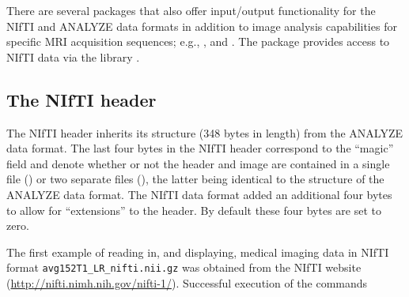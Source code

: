 \documentclass[
]{article}
\begin{document}
There are several  packages that also offer input/output
functionality for the NIfTI and ANALYZE data formats in addition to
image analysis capabilities for specific MRI acquisition sequences;
e.g.,  \citep{AnalyzeFMRI}, 
\citep{pol-tab:fmri} and  \citep{tractor.base}. The
 package provides access to NIfTI data via the
 library \citep{Rniftilib}.

\subsection{The NIfTI header}
\label{sec:nifti-header}

The NIfTI header inherits its structure (348 bytes in length) from the
ANALYZE data format. The last four bytes in the NIfTI header correspond
to the ``magic'' field and denote whether or not the header and image
are contained in a single file () or two separate files (), the latter being identical to the structure
of the ANALYZE data format. The NIfTI data format added an additional
four bytes to allow for ``extensions'' to the header. By default these
four bytes are set to zero.

The first example of reading in, and displaying, medical imaging data in
NIfTI format \texttt{avg152T1\_LR\_nifti.nii.gz} was obtained from the
NIfTI website (\url{http://nifti.nimh.nih.gov/nifti-1/}). Successful
execution of the commands
\end{document}
